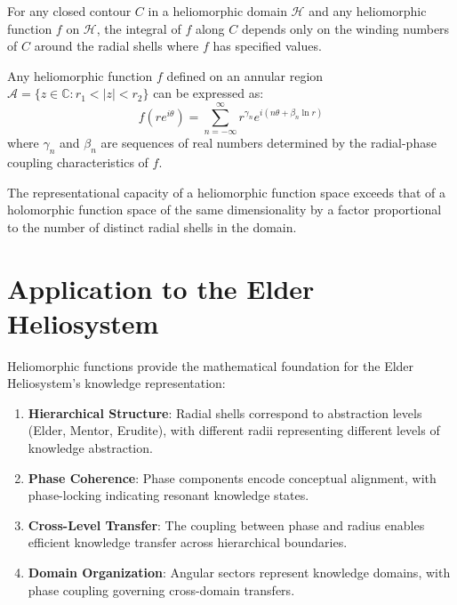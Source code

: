 \begin{theorem}
For any closed contour $C$ in a heliomorphic domain $\mathcal{H}$ and any heliomorphic function $f$ on $\mathcal{H}$, the integral of $f$ along $C$ depends only on the winding numbers of $C$ around the radial shells where $f$ has specified values.
\end{theorem}

\begin{theorem}
Any heliomorphic function $f$ defined on an annular region $\mathcal{A} = \{z \in \mathbb{C} : r_1 < |z| < r_2\}$ can be expressed as:
\begin{equation}
f(re^{i\theta}) = \sum_{n=-\infty}^{\infty} r^{\gamma_n} e^{i(n\theta + \beta_n \ln r)}
\end{equation}
where $\gamma_n$ and $\beta_n$ are sequences of real numbers determined by the radial-phase coupling characteristics of $f$.
\end{theorem}

\begin{theorem}
The representational capacity of a heliomorphic function space exceeds that of a holomorphic function space of the same dimensionality by a factor proportional to the number of distinct radial shells in the domain.
\end{theorem}

\section{Application to the Elder Heliosystem}

Heliomorphic functions provide the mathematical foundation for the Elder Heliosystem's knowledge representation:

\begin{enumerate}
    \item \textbf{Hierarchical Structure}: Radial shells correspond to abstraction levels (Elder, Mentor, Erudite), with different radii representing different levels of knowledge abstraction.
    
    \item \textbf{Phase Coherence}: Phase components encode conceptual alignment, with phase-locking indicating resonant knowledge states.
    
    \item \textbf{Cross-Level Transfer}: The coupling between phase and radius enables efficient knowledge transfer across hierarchical boundaries.
    
    \item \textbf{Domain Organization}: Angular sectors represent knowledge domains, with phase coupling governing cross-domain transfers.
\end{enumerate}

